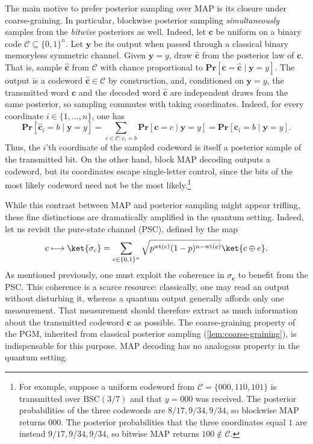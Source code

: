 \documentclass[11pt]{article}
\theoremstyle{remark}
\newcommand{\cC}{\mathcal{C}}
\newcommand{\wt}{\operatorname{wt}}
\newcommand{\Prb}{\mathbf{Pr}}
\newcommand{\bits}{\{0,1\}}
\newcommand{\bchat}{\hat{\mathbf{c}}}
\newcommand{\bc}{\mathbf{c}}
\newcommand{\by}{\mathbf{y}}
\newcommand{\BSC}{\mathrm{BSC}}
\begin{document}
The main motive to prefer posterior sampling over MAP is its closure under coarse-graining. In particular, blockwise posterior sampling \emph{simultaneously} samples from the \emph{bitwise} posteriors as well. Indeed, let $\bc$ be uniform on a binary code $\cC \subseteq \bits^n$. Let $\by$ be its output when passed through a classical binary memoryless symmetric channel. Given $\by = y$, draw $\bchat$ from the posterior law of $\bc$. That is, sample $\bchat$ from $\cC$ with chance proportional to $\Prb[\bc = \bchat \mid \by = y]$. The output is a codeword $\bchat \in \cC$ by construction, and, conditioned on $\by = y$, the transmitted word $\bc$ and the decoded word $\bchat$ are independent draws from the same posterior, so sampling commutes with taking coordinates. Indeed, for every coordinate $i \in \{1, \ldots , n\}$, one has
\begin{equation*}
\Prb[\bchat_i = b \mid \by = y]
= \sum_{c \in \cC : c_i = b}{\Prb[\bc = c \mid \by = y]}
= \Prb[\bc_i = b \mid \by = y].
\end{equation*}
Thus, the $i$'th coordinate of the sampled codeword is itself a posterior sample of the transmitted bit. On the other hand, block MAP decoding outputs a codeword, but its coordinates escape single-letter control, since the bits of the most likely codeword need not be the most likely.\footnote{For example, suppose a uniform codeword from $\cC=\{000,110,101\}$ is transmitted over $\BSC(3/7)$ and that $y=000$ was received. The posterior probabilities of the three codewords are $8/17,9/34,9/34$, so blockwise MAP returns $000$. The posterior probabilities that the three coordinates equal $1$ are instead $9/17,9/34,9/34$, so bitwise MAP returns $100\notin\cC$.}

While this contrast between MAP and posterior sampling might appear trifling, these fine distinctions are dramatically amplified in the quantum setting. Indeed, let us revisit the pure-state channel (PSC), defined by the map
\begin{equation*}
c \longmapsto \ket{\sigma_c} = \sum_{e \in \bits^n}{\sqrt{p^{\wt(e)}(1-p)^{n-\wt(e)}}\ket{c \oplus e}}.
\end{equation*}
As mentioned previously, one must exploit the coherence in $\sigma_\bc$ to benefit from the PSC. This coherence is a scarce resource: classically, one may read an output without disturbing it, whereas a quantum output generally affords only one measurement. That measurement should therefore extract as much information about the transmitted codeword $\bc$ as possible. The coarse-graining property of the PGM, inherited from classical posterior sampling (\cref{lem:coarse-graining}), is indispensable for this purpose. MAP decoding has no analogous property in the quantum setting.
\end{document}
